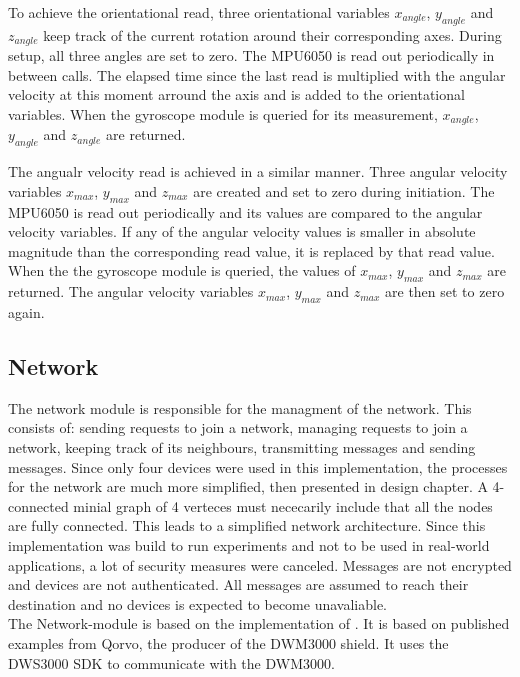 To achieve the orientational read, three orientational variables $x_{angle}$, $y_{angle}$ and $z_{angle}$ keep track of the current rotation around their corresponding axes.
During setup, all three angles are set to zero.
The MPU6050 is read out periodically in between calls.
The elapsed time since the last read is multiplied with the angular velocity at this moment arround the axis and is added to the orientational variables.
When the gyroscope module is queried for its measurement, $x_{angle}$, $y_{angle}$ and $z_{angle}$ are returned.


The angualr velocity read is achieved in a similar manner.
Three angular velocity variables $x_{max}$, $y_{max}$ and $z_{max}$ are created and set to zero during initiation.
The MPU6050 is read out periodically and its values are compared to the angular velocity variables.
If any of the angular velocity values is smaller in absolute magnitude than the corresponding read value, it is replaced by that read value.
When the the gyroscope module is queried, the values of $x_{max}$, $y_{max}$ and $z_{max}$ are returned.
The angular velocity variables $x_{max}$, $y_{max}$ and $z_{max}$ are then set to zero again.

\subsection{Network}
\label{s:network}
The network module is responsible for the managment of the network.
This consists of: sending requests to join a network, managing requests to join a network, keeping track of its neighbours, transmitting messages and sending messages.
Since only four devices were used in this implementation, the processes for the network are much more simplified, then presented in design chapter.
A 4-connected minial graph of 4 verteces must nececarily include that all the nodes are fully connected.
This leads to a simplified network architecture.
Since this implementation was build to run experiments and not to be used in real-world applications, a lot of security measures were canceled.
Messages are not encrypted and devices are not authenticated.
All messages are assumed to reach their destination and no devices is expected to become unavaliable. \\
The Network-module is based on the implementation of \cite{degkwitz2023ultrawideband}.
It is based on published examples from Qorvo, the producer of the DWM3000 shield.
It uses the DWS3000 SDK to communicate with the DWM3000.


